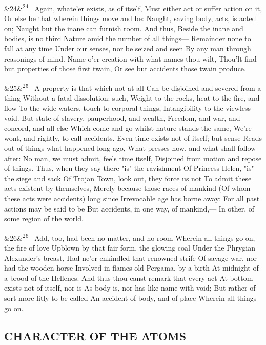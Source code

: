 \documentclass[12pt]{article}
\newcommand{\para}[1][]{\par\noindent\ifx&#1&\else\textsuperscript{\footnotesize #1}~\fi}
\begin{document}
\para[24] Again, whate'er exists, as of itself, Must either act or suffer action on it, Or else be that wherein things move and be: Naught, saving body, acts, is acted on; Naught but the inane can furnish room. And thus, Beside the inane and bodies, is no third Nature amid the number of all things--- Remainder none to fall at any time Under our senses, nor be seized and seen By any man through reasonings of mind. Name o'er creation with what names thou wilt, Thou'lt find but properties of those first twain, Or see but accidents those twain produce.

\para[25] A property is that which not at all Can be disjoined and severed from a thing Without a fatal dissolution: such, Weight to the rocks, heat to the fire, and flow To the wide waters, touch to corporal things, Intangibility to the viewless void. But state of slavery, pauperhood, and wealth, Freedom, and war, and concord, and all else Which come and go whilst nature stands the same, We're wont, and rightly, to call accidents. Even time exists not of itself; but sense Reads out of things what happened long ago, What presses now, and what shall follow after: No man, we must admit, feels time itself, Disjoined from motion and repose of things. Thus, when they say there "is" the ravishment Of Princess Helen, "is" the siege and sack Of Trojan Town, look out, they force us not To admit these acts existent by themselves, Merely because those races of mankind (Of whom these acts were accidents) long since Irrevocable age has borne away: For all past actions may be said to be But accidents, in one way, of mankind,--- In other, of some region of the world.

\para[26] Add, too, had been no matter, and no room Wherein all things go on, the fire of love Upblown by that fair form, the glowing coal Under the Phrygian Alexander's breast, Had ne'er enkindled that renowned strife Of savage war, nor had the wooden horse Involved in flames old Pergama, by a birth At midnight of a brood of the Hellenes. And thus thou canst remark that every act At bottom exists not of itself, nor is As body is, nor has like name with void; But rather of sort more fitly to be called An accident of body, and of place Wherein all things go on.

\subsection*{CHARACTER OF THE ATOMS}
\end{document}
